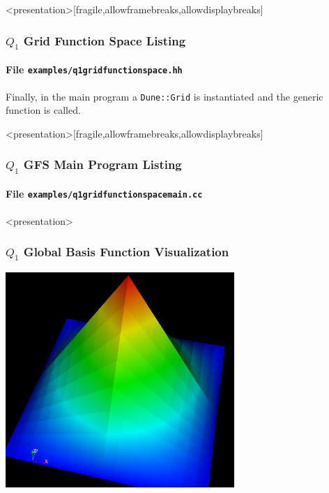\begin{frame}<presentation>[fragile,allowframebreaks,allowdisplaybreaks]
\frametitle<presentation>{$Q_1$ Grid Function Space Listing}
\framesubtitle<presentation>{File \texttt{examples/q1gridfunctionspace.hh}}

\end{frame}

Finally, in the main program a \lstinline{Dune::Grid} is instantiated
and the generic function is called.

\begin{frame}<presentation>[fragile,allowframebreaks,allowdisplaybreaks]
\frametitle<presentation>{$Q_1$ GFS Main Program Listing}
\framesubtitle<presentation>{File \texttt{examples/q1gridfunctionspacemain.cc}}

\end{frame}


\begin{frame}<presentation>
\frametitle<presentation>{$Q_1$ Global Basis Function Visualization}
\begin{center}
\includegraphics[width=0.65\textwidth]{./EPS/q1}
\end{center}
\end{frame}

